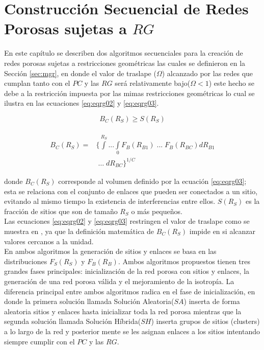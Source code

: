 \chapter[Construcción Secuencial]{Construcción Secuencial de Redes Porosas sujetas a $RG$}
\label{champ:BSGR}
\bigskip
\barra
\bigskip

En este capítulo se describen dos algoritmos secuenciales para la creación de redes porosas sujetas a restricciones geométricas las cuales se definieron en la Sección \ref{sec:mgr}, en donde el valor de traslape ($\Omega$) alcanzado por las redes que cumplan tanto con el $PC$ y las $RG$ será relativamente bajo($\Omega<1$) este hecho se debe a la restricción impuesta por las mimas restricciones geométricas lo cual se ilustra en las ecuaciones \ref{eq:eqrg02} y \ref{eq:eqrg03}.

\begin{equation}
B_C(R_S) \geq S(R_S)
\label{eq:eqrg02}
\end{equation}

\begin{eqnarray}
\nonumber \\
B_C(R_S) = & \{\int\limits^{R_S} ... \int\limits_{0} F_B(R_{B1})\; ... \; F_B(R_{BC})dR_{B1} \nonumber \\
& \; \ldots \; dR_{BC} \}^{1/C}
\label{eq:eqrg03}
\end{eqnarray}

donde $B_C(R_S)$ corresponde al volumen definido por la ecuación \ref{eq:eqrg03}; esta se relaciona con el conjunto de enlaces que pueden ser conectados a un sitio, evitando al mismo tiempo la existencia de interferencias entre ellos. $S(R_S)$ es la fracción de sitios que son de tamaño $R_S$ o más pequeños.\\

Las ecuaciones \ref{eq:eqrg02} y \ref{eq:eqrg03} restringen el valor de traslape como se muestra en \cite{ref5}, ya que la definición matemática de $B_C(R_S)$ impide en si alcanzar valores cercanos a la unidad.\\

En ambos algoritmos la generación de sitios y enlaces se basa en las distribuciones $F_S(R_S)$ y $F_B(R_B)$. Ambos algoritmos propuestos  tienen tres grandes fases principales: inicialización de la red porosa con sitios y enlaces, la generación de una red porosa válida y el mejoramiento de la isotropía. La diferencia principal entre ambos algoritmos radica en el fase de inicialización, en donde la primera solución llamada Solución Aleatoria($SA$) inserta de forma aleatoria sitios y enlaces hasta inicializar toda la red porosa mientras que la segunda solución llamada Solución Híbrida($SH$) inserta grupos de sitios (clusters) a lo largo de la red y posterior mente se les asignan enlaces a los sitios intentando siempre cumplir con el $PC$ y las $RG$.\\

